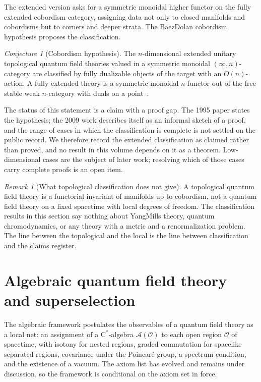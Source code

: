 \documentclass[11pt,letterpaper]{article}
\theoremstyle{definition}
\theoremstyle{remark}
\newtheorem{remark}[theorem]{Remark}
\newtheorem{conjecture}[theorem]{Conjecture}
\begin{document}
The extended version asks for a symmetric monoidal higher functor on the fully extended cobordism category, assigning data not only to closed manifolds and cobordisms but to corners and deeper strata. The Baez\textendash{}Dolan cobordism hypothesis proposes the classification.

\begin{conjecture}[Cobordism hypothesis]
\label{conj:cobordism}
The $n$-dimensional extended unitary topological quantum field theories valued in a symmetric monoidal $(\infty, n)$-category are classified by fully dualizable objects of the target with an $O(n)$-action. A fully extended theory is a symmetric monoidal $n$-functor out of the free stable weak $n$-category with duals on a point~\cite{baez-dolan, lurie}.
\end{conjecture}

The status of this statement is a claim with a proof gap. The 1995 paper states the hypothesis; the 2009 work describes itself as an informal sketch of a proof, and the range of cases in which the classification is complete is not settled on the public record. We therefore record the extended classification as claimed rather than proved, and no result in this volume depends on it as a theorem. Low-dimensional cases are the subject of later work; resolving which of those cases carry complete proofs is an open item.

\begin{remark}[What topological classification does not give]
\label{rem:tqft-scope}
A topological quantum field theory is a functorial invariant of manifolds up to cobordism, not a quantum field theory on a fixed spacetime with local degrees of freedom. The classification results in this section say nothing about Yang\textendash{}Mills theory, quantum chromodynamics, or any theory with a metric and a renormalization problem. The line between the topological and the local is the line between classification and the claims register.
\end{remark}

\section{Algebraic quantum field theory and superselection}
\label{sec:aqft}

The algebraic framework postulates the observables of a quantum field theory as a local net: an assignment of a $\mathrm{C}^*$-algebra $\mathcal{A}(\mathcal{O})$ to each open region $\mathcal{O}$ of spacetime, with isotony for nested regions, graded commutation for spacelike separated regions, covariance under the Poincar\'e group, a spectrum condition, and the existence of a vacuum. The axiom list has evolved and remains under discussion, so the framework is conditional on the axiom set in force.
\end{document}
